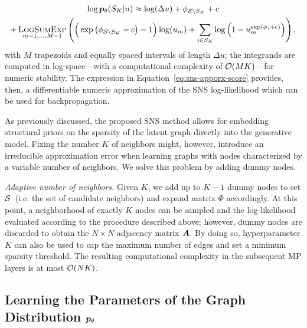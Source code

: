 \begin{multline}\label{eq:sns-apporx-score}
    \log{{{\bm{p}}_\theta}(S_K|n)} \approx
    \log(\Delta u) + \phi_{\mathcal{S} \setminus S_K} + c \\ +
    \operatorname*{\textsc{LogSumExp}}_{m=1,\dots,M-1}\left(\Big(\exp\left(\phi_{\mathcal{S} \setminus S_K} + c\right) - 1\Big)\log(u_m) + \sum_{i\in S_K}\log\left(1-u_m^{\exp(\phi_i + c)}\right)\right),
\end{multline}
with $M$ trapezoids and equally spaced intervals of length $\Delta u$; the integrands are computed in log-space---with a computational complexity of $\mathcal{O}(MK)$---for numeric stability. The expression in Equation~\eqref{eq:sns-apporx-score} provides, then, a differentiable numeric approximation of the SNS log-likelihood which can be used for backpropagation. 

As previously discussed, the proposed SNS method allows for embedding structural priors on the sparsity of the latent graph directly into the generative model. Fixing the number $K$ of neighbors might, however, introduce an irreducible approximation error when learning graphs with nodes characterized by a variable number of neighbors. We solve this problem by adding dummy nodes.

\textit{Adaptive number of neighbors.} 
Given $K$, we add up to $K-1$ dummy nodes to set $\mathcal{S}$~(i.e. the set of candidate neighbors) and expand matrix $\Phi$ accordingly. At this point, a neighborhood of exactly $K$ nodes can be sampled and the log-likelihood evaluated according to the procedure described above; however, dummy nodes are discarded to obtain the $N\times N$ adjacency matrix ${\bm{A}}$. By doing so, hyperparameter $K$ can also be used to cap the maximum number of edges and set a minimum sparsity threshold. The resulting computational complexity in the subsequent MP layers is at most $\mathcal{O}(NK)$.

\subsection[Parametrizing]{Learning the Parameters of the Graph Distribution ${{\bm{p}}_\theta}$}\label{s:ptheta}

